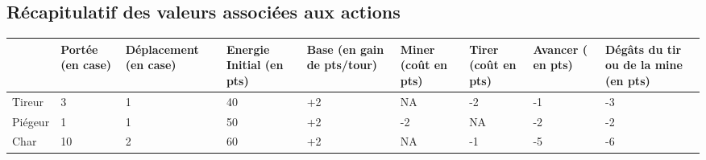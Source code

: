 \documentclass[12pt,a4paper]{article}
\begin{document}
		\subsection{Récapitulatif des valeurs associées aux actions}
		\hspace{-3cm}
			\begin{tabular}{|p{1.8cm}||p{1cm}|p{2cm}|p{1.5cm}|p{2cm}|p{1.5cm}|p{1.5cm}|p{1.5cm}|p{2cm}|}
					\hline
			 	   & Portée (en case) & Déplacement (en case) & Energie Initial (en pts) & Base (en gain de pts/tour) & Miner (coût en pts) & Tirer (coût en pts) & Avancer ( en pts) & Dégâts du tir ou de la mine (en pts) \\
			 	  \hline \hline
			 	  Tireur 	& 3 	& 1 & 40 & +2 & NA & -2 & -1 & -3 \\
			 	  \hline
			 	  Piégeur & 1 	& 1 & 50 & +2 & -2 & NA & -2 & -2 \\
			 	  \hline
				  Char 		& 10 	& 2 & 60 & +2 & NA & -1 & -5 & -6 \\
					\hline
			\end{tabular}
\end{document}
